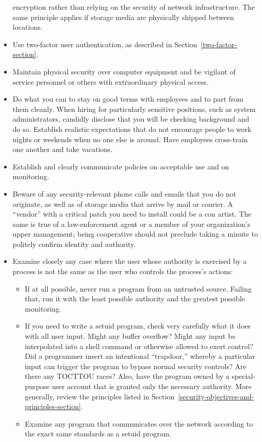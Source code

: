 \begin{itemize}
encryption rather than relying on the security of network
infrastructure.  The same principle applies if storage media are
physically shipped between locations.
\item
Use two-factor user authentication, as described in
Section~\ref{two-factor-section}.
\item
Maintain physical security over computer equipment and be vigilant of
service personnel or others with extraordinary physical access.
\item
Do what you can to stay on good terms with employees and to part from
them cleanly.  When hiring for particularly sensitive positions, such
as system administrators, candidly disclose that you will be checking
background and do so.  Establish realistic expectations that do not
encourage people to work nights or weekends when no one else is
around.  Have employees cross-train one another and take vacations.
\item
Establish and clearly communicate policies on acceptable use and on
monitoring.
\item
Beware of any security-relevant phone calls and emails that you do not
originate, as well as of storage media that arrive by mail or courier.  A
``vendor'' with a critical patch you need to install could be a con
artist.  The same is true of a law-enforcement agent or a member of
your organization's upper management; being cooperative should not
preclude taking a minute to politely confirm identity and authority.
\item
Examine closely any case where the user whose authority is exercised by a process is not the same as the user who controls the process's actions:
\begin{itemize}
\item
If at all possible, never run a program from an untrusted source.
Failing that, run it with the least possible authority and the
greatest possible monitoring.
\item
If you need to write a setuid program, check very carefully what it
does with all user input.  Might any buffer overflow?  Might any input
be interpolated into a shell command or otherwise allowed to exert
control?  Did a programmer insert an intentional ``trapdoor,'' whereby
a particular input can trigger the program to bypass normal security
controls?  Are there any TOCTTOU races?  Also, have the program owned
by a special-purpose user account that is granted only the necessary
authority.  More generally, review the principles listed in
Section~\ref{security-objectives-and-principles-section}.
\item
Examine any program that communicates over the network according to the
exact same standards as a setuid program.
\end{itemize}
\end{itemize}

